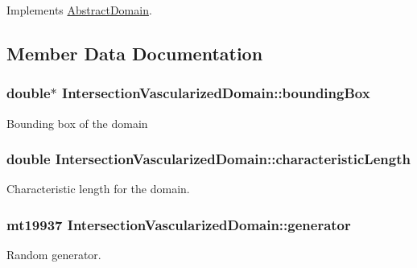 Implements \hyperlink{class_abstract_domain_a8544eef21fb6700ecc02e9cd50884efd}{Abstract\+Domain}.



\subsection{Member Data Documentation}
\subsubsection[{\texorpdfstring{bounding\+Box}{boundingBox}}]{\setlength{\rightskip}{0pt plus 5cm}double$\ast$ Intersection\+Vascularized\+Domain\+::bounding\+Box\hspace{0.3cm}{\ttfamily [private]}}\hypertarget{class_intersection_vascularized_domain_a09393f0750ed293a45953f3a080cd7d6}{}\label{class_intersection_vascularized_domain_a09393f0750ed293a45953f3a080cd7d6}
Bounding box of the domain 
\subsubsection[{\texorpdfstring{characteristic\+Length}{characteristicLength}}]{\setlength{\rightskip}{0pt plus 5cm}double Intersection\+Vascularized\+Domain\+::characteristic\+Length\hspace{0.3cm}{\ttfamily [private]}}\hypertarget{class_intersection_vascularized_domain_a6cd023b45323ac979b45ff56597ad621}{}\label{class_intersection_vascularized_domain_a6cd023b45323ac979b45ff56597ad621}
Characteristic length for the domain. 
\subsubsection[{\texorpdfstring{generator}{generator}}]{\setlength{\rightskip}{0pt plus 5cm}mt19937 Intersection\+Vascularized\+Domain\+::generator\hspace{0.3cm}{\ttfamily [private]}}\hypertarget{class_intersection_vascularized_domain_a6245d7a96b0c7e453080ccde826ea654}{}\label{class_intersection_vascularized_domain_a6245d7a96b0c7e453080ccde826ea654}
Random generator. 
